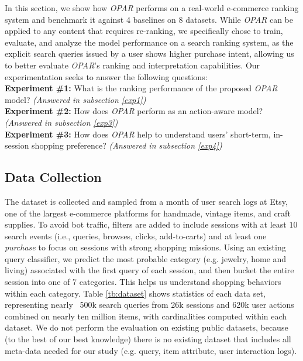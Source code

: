 \documentclass[11pt, dvipdfmx]{article}
\begin{document}
In this section, we show how \textit{OPAR} performs on a real-world e-commerce ranking system and benchmark it against 4 baselines on 8 datasets. While \emph{OPAR} can be applied to any content that requires re-ranking, we specifically chose to train, evaluate, and analyze the model performance on a search ranking system, as the explicit search queries issued by a user shows higher purchase intent, allowing us to better evaluate \emph{OPAR}'s ranking and interpretation capabilities. Our experimentation seeks to answer the following questions:\\
\noindent \textbf{Experiment \#1:} What is the ranking performance of the proposed \textit{OPAR} model? \textit{(Answered in subsection \ref{exp1})}\\
\noindent \textbf{Experiment \#2:} How does \textit{OPAR} perform as an action-aware model? \textit{(Answered in subsection \ref{exp3})}\\
\noindent \textbf{Experiment \#3:} How does \textit{OPAR} help to understand users' short-term, in-session shopping preference? \textit{(Answered in subsection \ref{exp4})}


\subsection{Data Collection}\label{sec:dataset}
The dataset is collected and sampled from a month of user search logs at Etsy, one of the largest e-commerce platforms for handmade, vintage items, and craft supplies. To avoid bot traffic, 
filters are added to include sessions with at least $10$ search events (i.e., queries, browses, clicks, add-to-carts) and at least one \textit{purchase} to focus on sessions with strong shopping missions. Using an existing query classifier, we predict the most probable category (e.g. jewelry, home and living) associated with the first query of each session, and then bucket the entire session into one of 7 categories. This helps us understand shopping behaviors within each category. 
Table \ref{tb:dataset} shows statistics of each data set, representing nearly ~500k search queries from 26k sessions and 620k user actions combined on nearly ten million items, with cardinalities computed within each dataset. We do not perform the evaluation on existing public datasets, because (to the best of our best knowledge) there is no existing dataset that includes all meta-data needed for our study (e.g. query, item attribute, user interaction logs).
\end{document}
